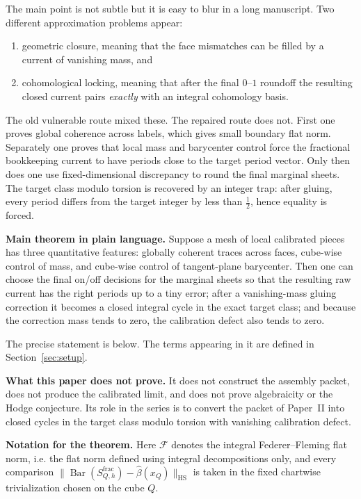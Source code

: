 \documentclass[11pt]{article}
\numberwithin{equation}{section}
\theoremstyle{plain}
\theoremstyle{definition}
\theoremstyle{remark}
\DeclareMathOperator{\HS}{HS}
\newcommand{\calF}{\mathcal{F}}
\newcommand{\Bary}{\operatorname{Bar}}
\begin{document}
The main point is not subtle but it is easy to blur in a long manuscript.  Two different approximation problems appear:
\begin{enumerate}
\item geometric closure, meaning that the face mismatches can be filled by a current of vanishing mass, and
\item cohomological locking, meaning that after the final $0$--$1$ roundoff the resulting closed current pairs \emph{exactly} with an integral cohomology basis.
\end{enumerate}
The old vulnerable route mixed these.  The repaired route does not.  First one proves global coherence across labels, which gives small boundary flat norm.  Separately one proves that local mass and barycenter control force the fractional bookkeeping current to have periods close to the target period vector.  Only then does one use fixed-dimensional discrepancy to round the final marginal sheets.  The target class modulo torsion is recovered by an integer trap: after gluing, every period differs from the target integer by less than $\tfrac12$, hence equality is forced.

\medskip

\noindent\textbf{Main theorem in plain language.}
Suppose a mesh of local calibrated pieces has three quantitative features: globally coherent traces across faces, cube-wise control of mass, and cube-wise control of tangent-plane barycenter.  Then one can choose the final on/off decisions for the marginal sheets so that the resulting raw current has the right periods up to a tiny error; after a vanishing-mass gluing correction it becomes a closed integral cycle in the exact target class; and because the correction mass tends to zero, the calibration defect also tends to zero.

\medskip

The precise statement is below.  The terms appearing in it are defined in Section~\ref{sec:setup}.

\medskip

\noindent\textbf{What this paper does not prove.}
It does not construct the assembly packet, does not produce the calibrated limit, and does not prove algebraicity or the Hodge conjecture.  Its role in the series is to convert the packet of Paper~II into closed cycles in the target class modulo torsion with vanishing calibration defect.

\medskip

\noindent\textbf{Notation for the theorem.}
Here $\calF$ denotes the integral Federer--Fleming flat norm, i.e. the flat norm
defined using integral decompositions only, and every comparison
$\|\Bary(S_{Q,h}^{\mathrm{frac}})-\widehat\beta(x_Q)\|_{\HS}$ is taken in the fixed
chartwise trivialization chosen on the cube $Q$.
\end{document}
